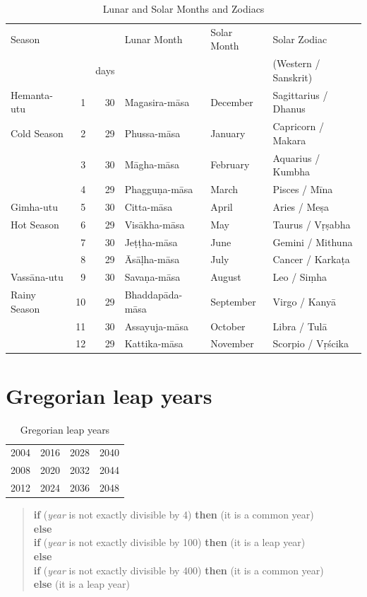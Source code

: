 \documentclass[11pt,oneside]{memoir-article}
\begin{document}
\begin{table}[htb]
\caption{\label{tbl-month-names}Lunar and Solar Months and Zodiacs\cite{hasapannyo-zodiac}}
\centering
\begin{tabular}{lrrlll}
Season &  &  & Lunar Month & Solar Month & Solar Zodiac\\
 &  & days &  &  & (Western / Sanskrit)\\
\hline
Hemanta-utu & 1 & 30 & Magasira-māsa & December & Sagittarius / Dhanus\\
Cold Season & 2 & 29 & Phussa-māsa & January & Capricorn / Makara\\
 & 3 & 30 & Māgha-māsa & February & Aquarius / Kumbha\\
 & 4 & 29 & Phagguṇa-māsa & March & Pisces / Mīna\\
\hline
Gimha-utu & 5 & 30 & Citta-māsa & April & Aries / Meṣa\\
Hot Season & 6 & 29 & Visākha-māsa & May & Taurus / Vṛṣabha\\
 & 7 & 30 & Jeṭṭha-māsa & June & Gemini / Mithuna\\
 & 8 & 29 & Āsāḷha-māsa & July & Cancer / Karkaṭa\\
\hline
Vassāna-utu & 9 & 30 & Savaṇa-māsa & August & Leo / Siṃha\\
Rainy Season & 10 & 29 & Bhaddapāda-māsa & September & Virgo / Kanyā\\
 & 11 & 30 & Assayuja-māsa & October & Libra / Tulā\\
 & 12 & 29 & Kattika-māsa & November & Scorpio / Vṛścika\\
\end{tabular}
\end{table}

\chapter{Gregorian leap years}
\label{sec-5}

\begin{table}[h]
\caption{\label{tbl-cycle-leap-years} Gregorian leap years}
\centering
\begin{tabular}{rrrr}
2004 & 2016 & 2028 & 2040\\
2008 & 2020 & 2032 & 2044\\
2012 & 2024 & 2036 & 2048\\
\end{tabular}
\end{table}

\begin{quote}
\textbf{if} (\emph{year} is not exactly divisible by 4) \textbf{then} (it is a common year)\\
\textbf{else}\\
\textbf{if} (\emph{year} is not exactly divisible by 100) \textbf{then} (it is a leap year)\\
\textbf{else}\\
\textbf{if} (\emph{year} is not exactly divisible by 400) \textbf{then} (it is a common year)\\
\textbf{else} (it is a leap year)
\cite{wp-leap-year}
\end{quote}
\end{document}

